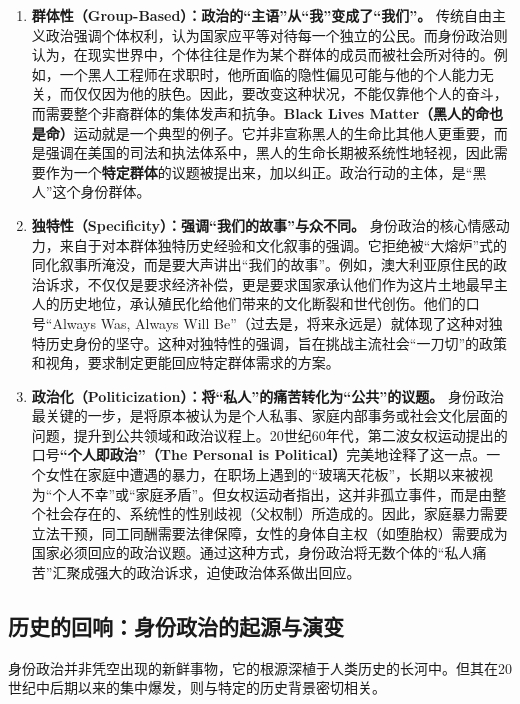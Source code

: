 \begin{enumerate}
    \item \textbf{群体性（Group-Based）：政治的“主语”从“我”变成了“我们”。}
    传统自由主义政治强调个体权利，认为国家应平等对待每一个独立的公民。而身份政治则认为，在现实世界中，个体往往是作为某个群体的成员而被社会所对待的。例如，一个黑人工程师在求职时，他所面临的隐性偏见可能与他的个人能力无关，而仅仅因为他的肤色。因此，要改变这种状况，不能仅靠他个人的奋斗，而需要整个非裔群体的集体发声和抗争。\textbf{Black Lives Matter（黑人的命也是命）}运动就是一个典型的例子。它并非宣称黑人的生命比其他人更重要，而是强调在美国的司法和执法体系中，黑人的生命长期被系统性地轻视，因此需要作为一个\textbf{特定群体}的议题被提出来，加以纠正。政治行动的主体，是“黑人”这个身份群体。

    \item \textbf{独特性（Specificity）：强调“我们的故事”与众不同。}
    身份政治的核心情感动力，来自于对本群体独特历史经验和文化叙事的强调。它拒绝被“大熔炉”式的同化叙事所淹没，而是要大声讲出“我们的故事”。例如，澳大利亚原住民的政治诉求，不仅仅是要求经济补偿，更是要求国家承认他们作为这片土地最早主人的历史地位，承认殖民化给他们带来的文化断裂和世代创伤。他们的口号“Always Was, Always Will Be”（过去是，将来永远是）就体现了这种对独特历史身份的坚守。这种对独特性的强调，旨在挑战主流社会“一刀切”的政策和视角，要求制定更能回应特定群体需求的方案。

    \item \textbf{政治化（Politicization）：将“私人”的痛苦转化为“公共”的议题。}
    身份政治最关键的一步，是将原本被认为是个人私事、家庭内部事务或社会文化层面的问题，提升到公共领域和政治议程上。20世纪60年代，第二波女权运动提出的口号\textbf{“个人即政治”（The Personal is Political）}完美地诠释了这一点。一个女性在家庭中遭遇的暴力，在职场上遇到的“玻璃天花板”，长期以来被视为“个人不幸”或“家庭矛盾”。但女权运动者指出，这并非孤立事件，而是由整个社会存在的、系统性的性别歧视（父权制）所造成的。因此，家庭暴力需要立法干预，同工同酬需要法律保障，女性的身体自主权（如堕胎权）需要成为国家必须回应的政治议题。通过这种方式，身份政治将无数个体的“私人痛苦”汇聚成强大的政治诉求，迫使政治体系做出回应。
\end{enumerate}

\subsection{历史的回响：身份政治的起源与演变}

身份政治并非凭空出现的新鲜事物，它的根源深植于人类历史的长河中。但其在20世纪中后期以来的集中爆发，则与特定的历史背景密切相关。

